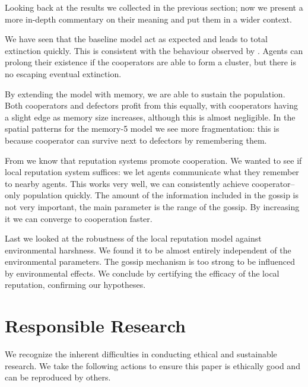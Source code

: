 \documentclass[english]{article}
\begin{document}
Looking back at the results we collected in the previous section;
now we present a more in-depth commentary on their meaning and
put them in a wider context.

We have seen that the baseline model act as expected and leads to total extinction quickly.
This is consistent with the behaviour observed by \citet{smaldino}.
Agents can prolong their existence if the cooperators are able to form a cluster,
but there is no escaping eventual extinction.

By extending the model with memory, we are able to sustain the population.
Both cooperators and defectors profit from this equally, with cooperators having a slight edge
as memory size increases, although this is almost negligible.
In the spatial patterns for the memory-5 model we see more fragmentation: this is because cooperator can survive next to defectors by remembering them.

From \citet{simple-reputation, public-private-monitoring} we know that reputation systems promote cooperation.
We wanted to see if local reputation system suffices: we let agents communicate what they remember to nearby agents.
This works very well, we can consistently achieve cooperator--only population quickly.
The amount of the information included in the gossip is not very important, the main parameter is the range of the gossip. By increasing it we can converge to cooperation faster.

Last we looked at the robustness of the local reputation model against environmental harshness.
We found it to be almost entirely independent of the environmental parameters.
The gossip mechanism is too strong to be influenced by environmental effects.
We conclude by certifying the efficacy of the local reputation, confirming our hypotheses.



\section{Responsible Research}
We recognize the inherent difficulties in conducting ethical and sustainable research.
We take the following actions to ensure this paper is ethically good and can be reproduced by others.
\end{document}
